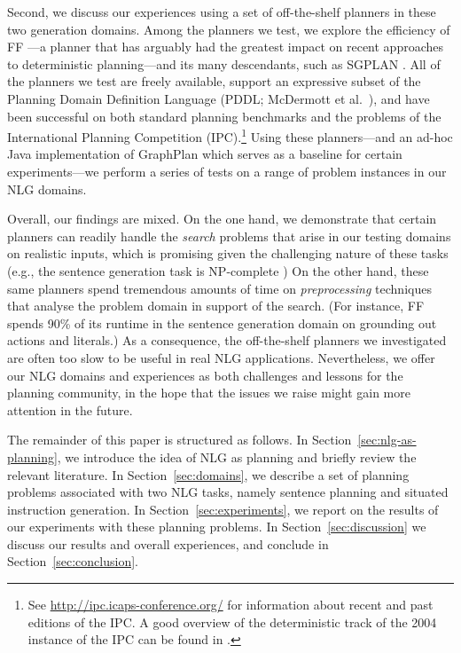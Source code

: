 Second, we discuss our experiences using a set of off-the-shelf planners in
these two generation domains. Among the planners we test, we explore the
efficiency of FF \citep{HoffmannNebel01}---a planner that has arguably had the
greatest impact on recent approaches to deterministic planning---and its many
descendants, such as SGPLAN \citep{hsu06:_new_featur_in_sgplan_for}. All of the
planners we test are freely available, support an expressive subset of the
Planning Domain Definition Language (PDDL; McDermott et al.~\citeyear{PDDL}),
and have been successful on both standard planning benchmarks and the problems
of the International Planning Competition (IPC).\footnote{See
  \url{http://ipc.icaps-conference.org/} for information about recent and past
  editions of the IPC. A good overview of the deterministic track of the 2004
  instance of the IPC can be found in \citep{Hoffmann-Edelkamp:05}.}
Using these planners---and an ad-hoc Java implementation of GraphPlan
\citep{Blum1997} which serves as a baseline for certain experiments---we perform
a series of tests on a range of problem instances in our NLG domains.

Overall, our findings are mixed. On the one hand, we demonstrate that certain
planners can readily handle the \emph{search} problems that arise in our testing
domains on realistic inputs, which is promising given the challenging nature of
these tasks (e.g., the sentence generation task is NP-complete \citep{KolStr02})
On the other hand, these same planners spend tremendous amounts of time on
\emph{preprocessing} techniques that analyse the problem domain in support of
the search. (For instance, FF spends 90\% of its runtime in the sentence
generation domain on grounding out actions and literals.) As a consequence, the
off-the-shelf planners we investigated are often too slow to be useful in real
NLG applications.  Nevertheless, we offer our NLG domains and experiences as
both challenges and lessons for the planning community, in the hope that the
issues we raise might gain more attention in the future.

The remainder of this paper is structured as follows. In
Section~\ref{sec:nlg-as-planning}, we introduce the idea of NLG as
planning and briefly review the relevant literature. In
Section~\ref{sec:domains}, we describe a set of planning problems
associated with two NLG tasks, namely sentence planning and situated
instruction generation. In Section~\ref{sec:experiments}, we report on
the results of our experiments with these planning problems.  In
Section~\ref{sec:discussion} we discuss our results and overall
experiences, and conclude in Section~\ref{sec:conclusion}.


